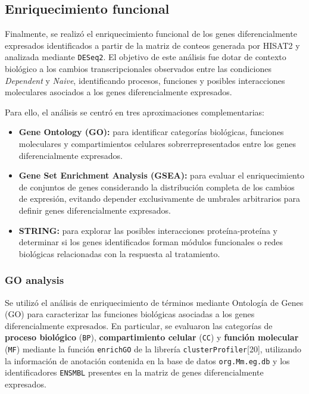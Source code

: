 \documentclass[
  9pt,
]{article}
\providecommand{\tightlist}{%
  \setlength{\itemsep}{0pt}\setlength{\parskip}{0pt}}
\begin{document}
\subsection{Enriquecimiento funcional}\label{enriquecimiento-funcional}

Finalmente, se realizó el enriquecimiento funcional de los genes
diferencialmente expresados identificados a partir de la matriz de
conteos generada por HISAT2 y analizada mediante \texttt{DESeq2}. El
objetivo de este análisis fue dotar de contexto biológico a los cambios
transcripcionales observados entre las condiciones \emph{Dependent} y
\emph{Naive}, identificando procesos, funciones y posibles interacciones
moleculares asociados a los genes diferencialmente expresados.

Para ello, el análisis se centró en tres aproximaciones complementarias:

\begin{itemize}
\tightlist
\item
  \textbf{Gene Ontology (GO):} para identificar categorías biológicas,
  funciones moleculares y compartimientos celulares sobrerrepresentados
  entre los genes diferencialmente expresados.
\item
  \textbf{Gene Set Enrichment Analysis (GSEA):} para evaluar el
  enriquecimiento de conjuntos de genes considerando la distribución
  completa de los cambios de expresión, evitando depender exclusivamente
  de umbrales arbitrarios para definir genes diferencialmente
  expresados.
\item
  \textbf{STRING:} para explorar las posibles interacciones
  proteína-proteína y determinar si los genes identificados forman
  módulos funcionales o redes biológicas relacionadas con la respuesta
  al tratamiento.
\end{itemize}

\subsubsection{GO analysis}\label{go-analysis}

Se utilizó el análisis de enriquecimiento de términos mediante Ontología
de Genes (GO) para caracterizar las funciones biológicas asociadas a los
genes diferencialmente expresados. En particular, se evaluaron las
categorías de \textbf{proceso biológico} (\texttt{BP}),
\textbf{compartimiento celular} (\texttt{CC}) y \textbf{función
molecular} (\texttt{MF}) mediante la función \texttt{enrichGO} de la
librería \texttt{clusterProfiler}{[}20{]}, utilizando la información de
anotación contenida en la base de datos \texttt{org.Mm.eg.db} y los
identificadores \texttt{ENSMBL} presentes en la matriz de genes
diferencialmente expresados.
\end{document}
